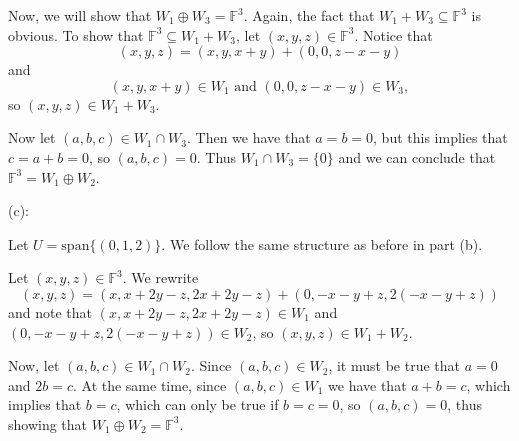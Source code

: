 \documentclass{article}
\theoremstyle{plain} %
\numberwithin{thm}{section} %
\theoremstyle{definition}
\begin{document}
\begin{question}{8}
        Now, we will show that \(W_1 \oplus W_3 = \mathbb{F}^3\). Again, the fact that \(W_1 + W_3 \subseteq \mathbb{F}^3\) is obvious. To show that \(\mathbb{F}^3 \subseteq W_1 + W_3\), let \((x,y,z) \in \mathbb{F}^3\). Notice that
        \[
            (x,y,z) = (x,y,x+y) + (0, 0, z - x - y)
        \]
        and
        \[
            (x,y,x+y) \in W_1 \text{ and } (0,0,z-x-y) \in W_3,
        \]
        so \((x,y,z) \in W_1 + W_3\).

        Now let \((a,b,c) \in W_1 \cap W_3\). Then we have that \(a = b = 0\), but this implies that \(c = a + b = 0\), so \((a,b,c) = 0\). Thus \(W_1 \cap W_3 = \{ 0 \}\) and we can conclude that \(\mathbb{F}^3 = W_1 \oplus W_2\).

        \medskip

        (c):

        Let \(U = \mathrm{span} \{ (0,1,2) \}\). We follow the same structure as before in part (b).

        Let \((x,y,z) \in \mathbb{F}^3\). We rewrite
        \[
            (x,y,z) = \left( x, x +2y-z, 2x+2y-z\right) + \left( 0,  - x - y + z, 2(- x - y + z)\right) 
        \]
        and note that \(\left( x, x +2y-z, 2x+2y-z\right) \in W_1\) and \(\left( 0,  - x - y + z, 2(- x - y + z)\right) \in W_2\), so \((x,y,z) \in W_1 + W_2\).

        Now, let \((a,b,c) \in W_1 \cap W_2\). Since \((a,b,c) \in W_2\), it must be true that \(a = 0\) and \(2b = c\). At the same time, since \((a,b,c) \in W_1\) we have that \(a + b = c\), which implies that \(b=c\), which can only be true if \(b = c = 0\), so \((a,b,c) = 0\), thus showing that \(W_1 \oplus W_2 = \mathbb{F}^3\).
    \end{question}
    \newpage
\end{document}
